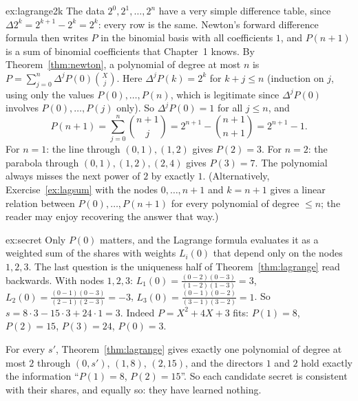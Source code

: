 \begin{solution}{ex:lagrange2k}
\idea The data $2^0,2^1,\dots,2^n$ have a very simple difference table, since $\Delta2^k=2^{k+1}-2^k=2^k$: every row is the same. Newton's forward difference formula then writes $P$ in the binomial basis with all coefficients $1$, and $P(n+1)$ is a sum of binomial coefficients that Chapter~1 knows.
\writeup By Theorem~\ref{thm:newton}, a polynomial of degree at most $n$ is $P=\sum_{j=0}^n\Delta^jP(0)\binom Xj$. Here $\Delta^jP(k)=2^k$ for $k+j\le n$ (induction on $j$, using only the values $P(0),\dots,P(n)$, which is legitimate since $\Delta^jP(0)$ involves $P(0),\dots,P(j)$ only). So $\Delta^jP(0)=1$ for all $j\le n$, and
\[
P(n+1)=\sum_{j=0}^n\binom{n+1}j=2^{n+1}-\binom{n+1}{n+1}=2^{n+1}-1.
\]
For $n=1$: the line through $(0,1),(1,2)$ gives $P(2)=3$. For $n=2$: the parabola through $(0,1),(1,2),(2,4)$ gives $P(3)=7$. The polynomial always misses the next power of $2$ by exactly $1$. (Alternatively, Exercise~\ref{ex:lagsum} with the nodes $0,\dots,n+1$ and $k=n+1$ gives a linear relation between $P(0),\dots,P(n+1)$ for every polynomial of degree $\le n$; the reader may enjoy recovering the answer that way.)
\end{solution}

\begin{solution}{ex:secret}
\idea Only $P(0)$ matters, and the Lagrange formula evaluates it as a weighted sum of the shares with weights $L_i(0)$ that depend only on the nodes $1,2,3$. The last question is the uniqueness half of Theorem~\ref{thm:lagrange} read backwards.
\writeup With nodes $1,2,3$:
$L_1(0)=\frac{(0-2)(0-3)}{(1-2)(1-3)}=3$, $L_2(0)=\frac{(0-1)(0-3)}{(2-1)(2-3)}=-3$, $L_3(0)=\frac{(0-1)(0-2)}{(3-1)(3-2)}=1$. So
$s=8\cdot3-15\cdot3+24\cdot1=3$. Indeed $P=X^2+4X+3$ fits: $P(1)=8$, $P(2)=15$, $P(3)=24$, $P(0)=3$.

For every $s'$, Theorem~\ref{thm:lagrange} gives exactly one polynomial of degree at most $2$ through $(0,s')$, $(1,8)$, $(2,15)$, and the
directors $1$ and $2$ hold exactly the information ``$P(1)=8$, $P(2)=15$''. So each candidate secret is consistent with their shares, and
equally so: they have learned nothing.
\end{solution}

